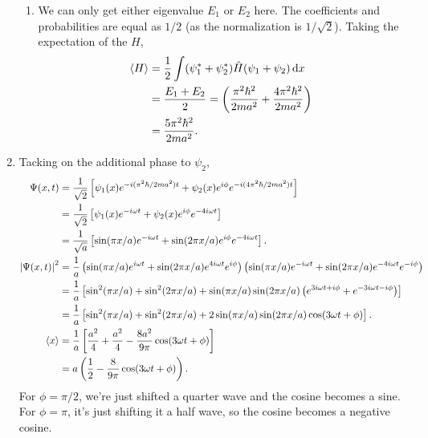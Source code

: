 \documentclass{homework}
\begin{document}
\begin{enumerate}
\begin{enumerate}
				\item We can only get either eigenvalue $E_1$ or $E_2$ here. The coefficients and probabilities are equal as $1/2$ (as the normalization is $1/\sqrt{2}$). Taking the expectation of the $H$, \begin{align*}
					\expval{H} & = \frac{1}{2}\int (\psi_1^* + \psi_2^*) \hat{H} (\psi_1 + \psi_2 ) \dd{x} \\
						& = \frac{E_1 + E_2}{2} = \left(\frac{ \pi^2 \hbar^2}{2 ma^2} + \frac{4 \pi^2 \hbar^2}{2ma^2}\right) \\
						& = \frac{5 \pi^2 \hbar^2}{2ma^2}.
				\end{align*}
			\end{enumerate}
		\item %
			Tacking on the additional phase to $\psi_2$, \begin{align*}
			\Psi(x, t) & = \frac{1}{\sqrt{2}} \left[
				\psi_1(x) e^{-i (\pi^2 \hbar / 2 ma^2)t}
				+ \psi_2(x) e^{i \phi}e^{-i (4 \pi^2 \hbar / 2 ma^2)t}
				\right] \\
				& = \frac{1}{\sqrt{2}} \left[
				\psi_1(x) e^{-i \omega t}
				+ \psi_2(x) e^{i \phi }e^{-4i \omega t}
				\right] \\
				& = \frac{1}{\sqrt{a}} \left[
				\sin(\pi x / a)e^{-i \omega t}
				+ \sin(2 \pi x / a) e^{i \phi} e^{-4i \omega t}
				\right]. \\
			\abs{ \Psi(x, t) }^2 & = \frac{1}{a} \left(
				\sin(\pi x / a)e^{i \omega t}
				+ \sin(2 \pi x / a) e^{4i \omega t} e^{i \phi}
				\right)
				\left(
				\sin(\pi x / a)e^{-i \omega t}
				+ \sin(2 \pi x / a) e^{-4i \omega t} e^{-i \phi}
				\right) \\
				& = \frac{1}{a} \left[
				\sin[2](\pi x / a)
				+ \sin[2](2 \pi x / a)
				+ \sin(\pi x / a) 
				\sin(2 \pi x / a)
				\left( e^{3 i \omega t + i \phi} + e^{-3i \omega t - i \phi} \right)
				\right] \\
				& = \frac{1}{a} \left[
				\sin[2](\pi x / a)
				+ \sin[2](2 \pi x / a)
				+ 2\sin(\pi x / a) 
				\sin(2 \pi x / a)
				\cos(3 \omega t + \phi)
				\right]. \\
			\expval{x} & = \frac{1}{a} \left[
				\frac{a^2}{4}
				+ \frac{a^2}{4}
				- \frac{8a^2}{9 \pi} \cos(3 \omega t + \phi)
				\right] \\
				& = a \left(
				\frac{1}{2}
				- \frac{8}{9 \pi} \cos(3 \omega t + \phi)
				\right).
			\end{align*}
			For $\phi = \pi/2$, we're just shifted a quarter wave and the cosine becomes a sine. For $\phi=\pi$, it's just shifting it a half wave, so the cosine becomes a negative cosine.
	\end{enumerate}
\end{document}
